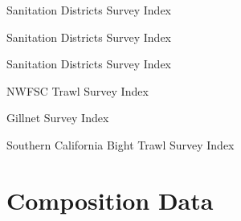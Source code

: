 \documentclass[ignorenonframetext,]{beamer}
\begin{document}
\begin{frame}{Sanitation Districts Survey Index}

\begin{table}[ht]
\centering
{}
\end{table}

\end{frame}

\begin{frame}{Sanitation Districts Survey Index}

\end{frame}

\begin{frame}{Sanitation Districts Survey Index}

\end{frame}

\begin{frame}{NWFSC Trawl Survey Index}

\end{frame}

\begin{frame}{Gillnet Survey Index}

\end{frame}

\begin{frame}{Southern California Bight Trawl Survey Index}

\end{frame}

\section{Composition Data}\label{composition-data}
\end{document}
